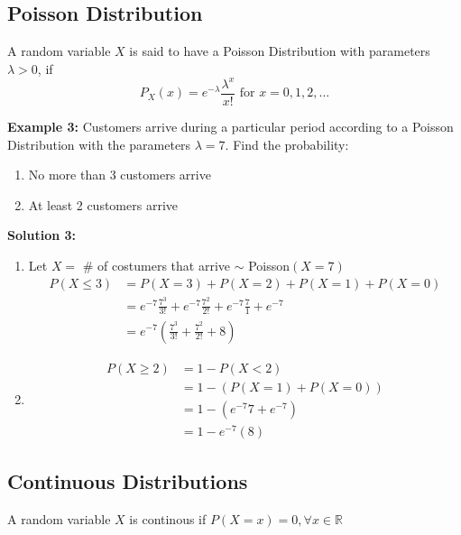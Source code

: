 \documentclass[12pt, twoside]{article}
\begin{document}
\subsection{Poisson Distribution}

\begin{tcolorbox}[title=Definition: Poisson Distribution]
	A random variable $X$ is said to have a Poisson Distribution with parameters $\lambda > 0$, if
	$$P_X (x) = e^{-\lambda} \frac{\lambda^x}{x!} \text{ for } x = 0,1,2,...$$
\end{tcolorbox}

\textbf{Example 3:} Customers arrive during a particular period according to a Poisson Distribution with the parameters $\lambda = 7$. Find the probability:
\begin{enumerate}
	\item{No more than 3 customers arrive}
	\item{At least 2 customers arrive}
\end{enumerate}

\textbf{Solution 3:}
\begin{enumerate}
	\item{
	Let $X = $ \# of costumers that arrive $\sim$ Poisson$(X = 7)$
	\begin{align*}
		P(X \leq 3) &= P(X = 3) + P(X = 2) + P(X = 1) + P(X = 0)\\
		&= e^{-7} \frac{7^3}{3!} + e^{-7} \frac{7^2}{2!} + e^{-7} \frac{7}{1} + e^{-7}\\
		&= e^{-7} (\frac{7^3}{3!} + \frac{7^2}{2!} + 8)
	\end{align*}
	}
	\item{
	\begin{align*}
		P(X \geq 2) &= 1 - P(X < 2)\\
		&= 1 - (P(X = 1) + P(X = 0))\\
		&= 1 - (e^{-7}7 + e^{-7})\\
		&= 1 - e^{-7}(8)
	\end{align*}
	}
\end{enumerate}

\subsection{Continuous Distributions}

\begin{tcolorbox}[title=Definition: Continuous Random Variables]
	A random variable $X$ is continous if $P(X = x) = 0,  \forall x \in\mathbb{R}$
\end{tcolorbox}
\end{document}
